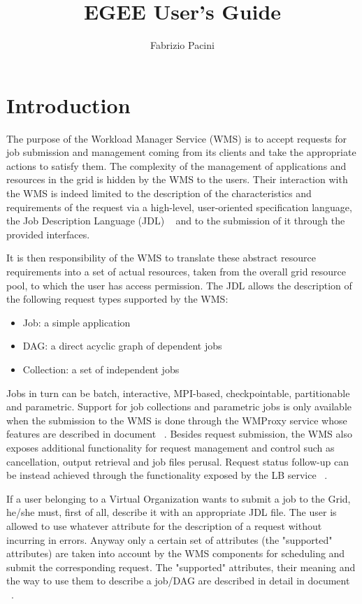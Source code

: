 \documentclass{egee}
\title{EGEE User's Guide}
\author{Fabrizio Pacini}
\begin{document}


\newpage

\tableofcontents

\newpage

\section{Introduction}

The purpose of the Workload Manager Service (WMS) is to accept requests for job submission and management 
coming from its clients and take the appropriate actions to satisfy them.
The complexity of the management of applications and resources in the grid is hidden by the WMS to 
the users. Their interaction with the WMS is indeed limited to the description of the characteristics and 
requirements of the request via a high-level, user-oriented specification language, the Job Description 
Language (JDL) ~\cite{jdl-lang} and to the submission of it through the provided interfaces.

It is then responsibility of the WMS to translate these abstract resource requirements into a set of actual 
resources, taken from the overall grid resource pool, to which the user has access permission.
The JDL allows the description of the following request types supported by the WMS:
\begin{itemize}
   \item{Job: a simple application}
   \item{DAG: a direct acyclic graph of dependent jobs }
   \item{Collection: a set of independent jobs }
\end{itemize}

Jobs in turn can be batch, interactive, MPI-based, checkpointable, partitionable and parametric.
Support for job collections and parametric jobs is only available when the submission to the WMS 
is done through the WMProxy service whose features are described in document ~\cite{WMPROXY}.
Besides request submission, the WMS  also exposes additional functionality for request 
management and control such as cancellation, output retrieval and job files perusal. 
Request status follow-up can be instead achieved through the functionality exposed by the 
LB service ~\cite{lb}.

If a user belonging to a Virtual Organization wants to submit a job to the Grid, he/she must, first 
of all, describe it with an appropriate JDL file. The user is allowed to use whatever attribute for the 
description of a request without incurring in errors. 
Anyway only a certain set of attributes (the "supported" attributes) are taken into account by the WMS 
components for scheduling and submit the corresponding request. The "supported" attributes, their meaning 
and the way to use them to describe a job/DAG are described in detail in document ~\cite{jdl}.
\end{document}
